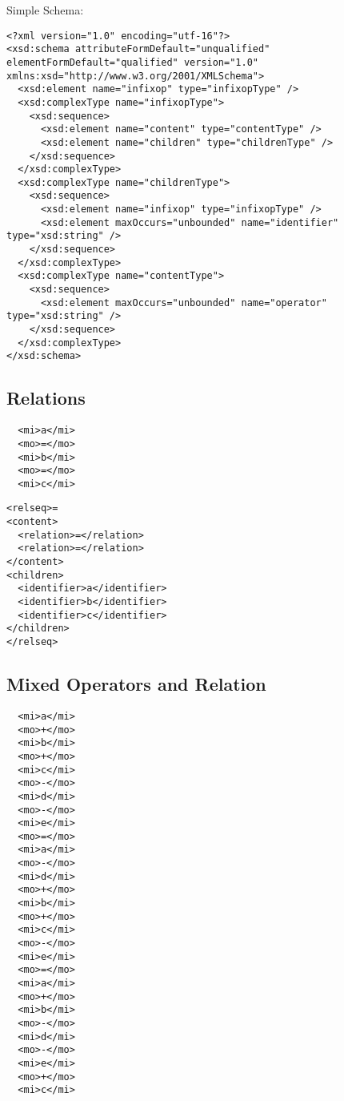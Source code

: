 \documentclass{article}
\begin{document}
Simple Schema:
\begin{lstlisting}
<?xml version="1.0" encoding="utf-16"?>
<xsd:schema attributeFormDefault="unqualified" elementFormDefault="qualified" version="1.0" xmlns:xsd="http://www.w3.org/2001/XMLSchema">
  <xsd:element name="infixop" type="infixopType" />
  <xsd:complexType name="infixopType">
    <xsd:sequence>
      <xsd:element name="content" type="contentType" />
      <xsd:element name="children" type="childrenType" />
    </xsd:sequence>
  </xsd:complexType>
  <xsd:complexType name="childrenType">
    <xsd:sequence>
      <xsd:element name="infixop" type="infixopType" />
      <xsd:element maxOccurs="unbounded" name="identifier" type="xsd:string" />
    </xsd:sequence>
  </xsd:complexType>
  <xsd:complexType name="contentType">
    <xsd:sequence>
      <xsd:element maxOccurs="unbounded" name="operator" type="xsd:string" />
    </xsd:sequence>
  </xsd:complexType>
</xsd:schema>
\end{lstlisting}



\subsection{Relations}
\label{sec:relations}

\begin{lstlisting}
  <mi>a</mi>
  <mo>=</mo>
  <mi>b</mi>
  <mo>=</mo>
  <mi>c</mi>
\end{lstlisting}

\begin{lstlisting}
<relseq>=
<content>
  <relation>=</relation>
  <relation>=</relation>
</content>
<children>
  <identifier>a</identifier>
  <identifier>b</identifier>
  <identifier>c</identifier>
</children>
</relseq>
\end{lstlisting}

\subsection{Mixed Operators and Relation}
\label{sec:operators-relations}

\begin{lstlisting}
  <mi>a</mi>
  <mo>+</mo>
  <mi>b</mi>
  <mo>+</mo>
  <mi>c</mi>
  <mo>-</mo>
  <mi>d</mi>
  <mo>-</mo>
  <mi>e</mi>
  <mo>=</mo>
  <mi>a</mi>
  <mo>-</mo>
  <mi>d</mi>
  <mo>+</mo>
  <mi>b</mi>
  <mo>+</mo>
  <mi>c</mi>
  <mo>-</mo>
  <mi>e</mi>
  <mo>=</mo>
  <mi>a</mi>
  <mo>+</mo>
  <mi>b</mi>
  <mo>-</mo>
  <mi>d</mi>
  <mo>-</mo>
  <mi>e</mi>
  <mo>+</mo>
  <mi>c</mi>
\end{lstlisting}
\end{document}
